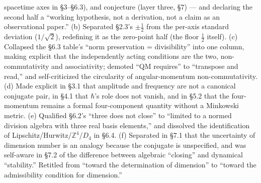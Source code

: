 \documentclass[
]{article}
\begin{document}
\begin{itemize}
  spacetime axes in §3--§6.3), and conjecture (layer three, §7) --- and
  declaring the second half a ``working hypothesis, not a derivation,
  not a claim as an observational paper.'' (b) Separated §2.3's
  \(\pm\tfrac12\) from the per-axis standard deviation (\(1/\sqrt2\)),
  redefining it as the zero-point half (the floor \(\tfrac12\) itself).
  (c) Collapsed the §6.3 table's ``norm preservation = divisibility''
  into one column, making explicit that the independently acting
  conditions are the two, non-commutativity and associativity; demoted
  ``QM requires'' to ``transpose and read,'' and self-criticized the
  circularity of angular-momentum non-commutativity. (d) Made explicit
  in §3.1 that amplitude and frequency are not a canonical conjugate
  pair, in §4.1 that \(\hbar\)'s role does not vanish, and in §5.2 that
  the four-momentum remains a formal four-component quantity without a
  Minkowski metric. (e) Qualified §6.2's ``three does not close'' to
  ``limited to a normed division algebra with three real basis
  elements,'' and dissolved the identification of
  Lipschitz/Hurwitz/\(\mathbb{Z}^4\)/\(D_4\) in §6.4. (f) Separated in
  §7.1 that the uncertainty of dimension number is an analogy because
  the conjugate is unspecified, and was self-aware in §7.2 of the
  difference between algebraic ``closing'' and dynamical ``stability.''
  Retitled from ``toward the determination of dimension'' to ``toward
  the admissibility condition for dimension.''
\end{itemize}
\end{document}
